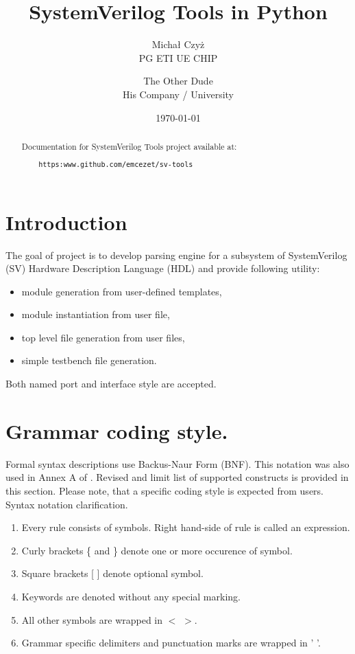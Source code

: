\documentclass{article}
\title{SystemVerilog Tools in Python}
\author{Michał Czyż  \\
    PG ETI UE CHIP \\
    \and 
    The Other Dude \\
    His Company / University \\
    }
\date{\today}
\begin{document}
\maketitle
\tableofcontents
\newpage

\begin{abstract}
Documentation for SystemVerilog Tools project available at:
\begin{verbatim}
    https:www.github.com/emcezet/sv-tools
\end{verbatim}

\end{abstract}

\section{Introduction}
{ The goal of project is to develop parsing engine for a subsystem of SystemVerilog (SV)
Hardware Description Language (HDL) and provide following utility:
\begin{itemize}
    \item module generation from user-defined templates,
    \item module instantiation from user file,
    \item top level file generation from user files,
    \item simple testbench file generation.
\end{itemize}
Both named port and interface style are accepted. }

\section{Grammar coding style.}
{ Formal syntax descriptions use Backus-Naur Form (BNF). This notation was also used in Annex A of \cite{standard}.
Revised and limit list of supported constructs is provided in this section. Please note, that a specific coding
style is expected from users. Syntax notation clarification.}

\begin{enumerate}
    \item Every rule consists of symbols. Right hand-side of rule is called an expression.
    \item Curly brackets \{ and \} denote one or more occurence of symbol.
    \item Square brackets [ ] denote optional symbol.
    \item Keywords are denoted without any special marking.
    \item All other symbols are wrapped in $<$ $>$.
    \item Grammar specific delimiters and punctuation marks are wrapped in ' '.
\end{enumerate}
\end{document}
